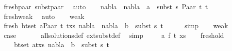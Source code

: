 \begin{isabellebody}
\ fresh{\isacharunderscore}{\kern0pt}paar\ subst{\isacharunderscore}{\kern0pt}paar\ \isamarkupfalse%
\ auto\isanewline
\ \ \isamarkupfalse%
\ {\isachardoublequoteopen}{\isacharparenleft}{\kern0pt}nabla{}\ {\isasymunion}\ nabla{}{\isacharparenright}{\kern0pt}\ {\isasymturnstile}\ a\ {\isasymsharp}\ subst\ s{}\ {\isacharparenleft}{\kern0pt}Paar\ t{}\ t{}{\isacharparenright}{\kern0pt}{\isachardoublequoteclose}\isanewline
\ \ \ \ \isamarkupfalse%
\ fresh{\isacharunderscore}{\kern0pt}weak\ \isamarkupfalse%
\ auto\isanewline
\ \ \isamarkupfalse%
\ weak{}\isanewline
\ \ \isamarkupfalse%
\ fresh{\isacharcolon}{\kern0pt}\ {\isachardoublequoteopen}{\isasymforall}{\isacharparenleft}{\kern0pt}b{\isacharcomma}{\kern0pt}t{\isacharparenright}{\kern0pt}{\isasymin}set\ {\isacharparenleft}{\kern0pt}{\isacharparenleft}{\kern0pt}a{\isacharcomma}{\kern0pt}Paar\ t{}\ t{}{\isacharparenright}{\kern0pt}{\isacharhash}{\kern0pt}xs{\isacharparenright}{\kern0pt}{\isachardot}{\kern0pt}\ {\isacharparenleft}{\kern0pt}nabla{}\ {\isasymunion}\ nabla{}{\isacharparenright}{\kern0pt}\ {\isasymturnstile}\ b\ {\isasymsharp}\ subst\ s{}\ t{\isachardoublequoteclose}\isanewline
\ \ \ \ \isamarkupfalse%
\ simp\isanewline
\ \ \isamarkupfalse%
\ weak{}{\isacharparenleft}{\kern0pt}{}{\isacharparenright}{\kern0pt}\ \isamarkupfalse%
\ {\isacharquery}{\kern0pt}case\ \isanewline
\ \ \ \ \isamarkupfalse%
\ all{\isacharunderscore}{\kern0pt}solutions{\isacharunderscore}{\kern0pt}def\ ext{\isacharunderscore}{\kern0pt}subst{\isacharunderscore}{\kern0pt}def\ \isamarkupfalse%
\ simp\isanewline
{}\isamarkupfalse%
\isanewline
\ \ \isamarkupfalse%
\ {\isacharparenleft}{\kern0pt}{}\ a\ f\ t{\isacharprime}{\kern0pt}\ xs{\isacharparenright}{\kern0pt}\isanewline
\ \ \isamarkupfalse%
\ fresh{\isacharunderscore}{\kern0pt}old{\isacharcolon}{\kern0pt}\isanewline
\ \ \ \ {\isachardoublequoteopen}{\isasymforall}{\isacharparenleft}{\kern0pt}b{\isacharcomma}{\kern0pt}t{\isacharparenright}{\kern0pt}{\isasymin}set\ {\isacharparenleft}{\kern0pt}{\isacharparenleft}{\kern0pt}a{\isacharcomma}{\kern0pt}t{\isacharprime}{\kern0pt}{\isacharparenright}{\kern0pt}{\isacharhash}{\kern0pt}xs{\isacharparenright}{\kern0pt}{\isachardot}{\kern0pt}\ nabla{}\ {\isasymturnstile}\ b\ {\isasymsharp}\ subst\ s{}\ t{\isachardoublequoteclose}\isanewline

\end{isabellebody}

